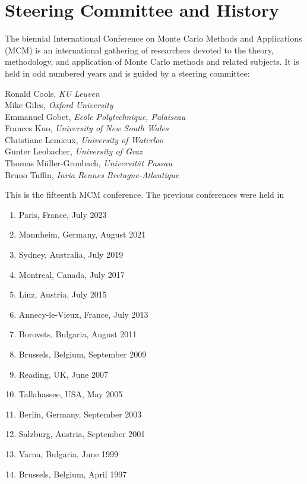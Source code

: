 

\section{Steering Committee and History}


The biennial International Conference on Monte Carlo Methods and Applications (MCM) is an international gathering of researchers devoted to the theory, methodology, and application of Monte Carlo methods and related subjects. It is held in odd numbered years and is guided by a steering committee: 

Ronald Cools, \emph{KU Leuven} \\
Mike Giles, \emph{Oxford University} \\
Emmanuel Gobet, \emph{Ecole Polytechnique, Palaiseau} \\
Frances Kuo, \emph{University of New South Wales} \\
Christiane Lemieux, \emph{University of Waterloo} \\
Gunter Leobacher, \emph{University of Graz} \\
Thomas Müller-Gronbach, \emph{Universität Passau} \\
Bruno Tuffin, \emph{Inria Rennes Bretagne-Atlantique}

This is the fifteenth MCM conference.  The previous  conferences were held in
\begin{enumerate}
\item Paris, France, July 2023
\item Mannheim, Germany, August 2021
\item Sydney, Australia, July 2019
\item Montreal, Canada, July 2017
\item Linz, Austria, July 2015
\item Annecy-le-Vieux, France, July 2013
\item Borovets, Bulgaria, August 2011
\item Brussels, Belgium, September 2009
\item Reading, UK, June 2007
\item Tallahassee, USA, May 2005
\item Berlin, Germany, September 2003
\item Salzburg, Austria, September 2001
\item Varna, Bulgaria, June 1999
\item Brussels, Belgium, April 1997 
\end{enumerate}

